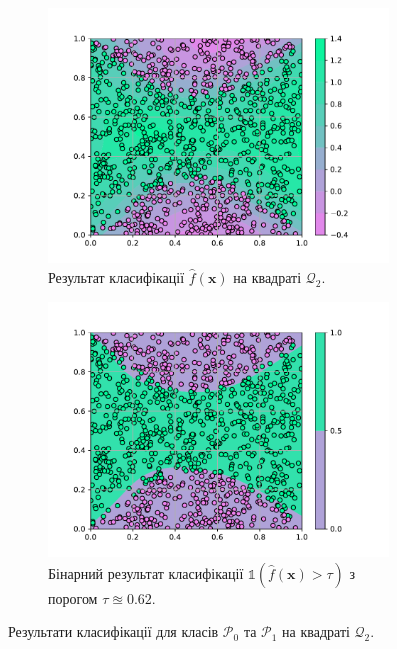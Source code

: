 \begin{figure}
	\centering
	\begin{subfigure}{0.49\textwidth}
		\centering
		\includegraphics[width=0.99\textwidth]{code/cybenko/classification-cont-prediction.pdf}
		\caption{Результат класифікації $\widehat{f}(\mathbf{x})$ на квадраті $\mathcal{Q}_2$.}
	\end{subfigure}
	\begin{subfigure}{0.49\textwidth}
		\centering
		\includegraphics[width=0.99\textwidth]{code/cybenko/classification-discr-prediction.pdf}
		\caption{Бінарний результат класифікації $\mathds{1}(\widehat{f}(\mathbf{x})>\tau)$ з порогом $\tau \approxeq 0.62$.}
	\end{subfigure}
	\caption{Результати класифікації для класів $\mathcal{P}_0$ та $\mathcal{P}_1$ на квадраті $\mathcal{Q}_2$.}
	\label{fig:classification_result}
\end{figure}

